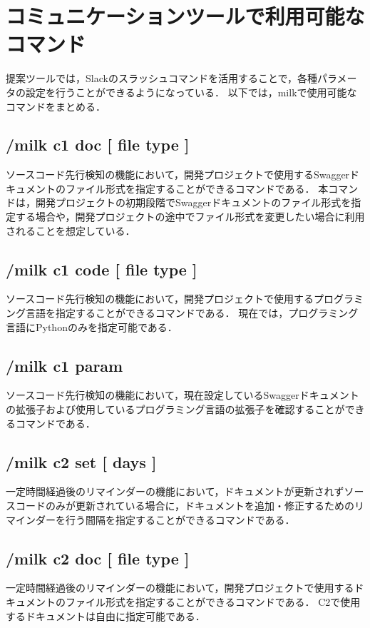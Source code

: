 \section{コミュニケーションツールで利用可能なコマンド}
提案ツールでは，Slackのスラッシュコマンドを活用することで，各種パラメータの設定を行うことができるようになっている．
以下では，milkで使用可能なコマンドをまとめる．

\subsection*{/milk c1 doc [ file type ]}
ソースコード先行検知の機能において，開発プロジェクトで使用するSwaggerドキュメントのファイル形式を指定することができるコマンドである．
本コマンドは，開発プロジェクトの初期段階でSwaggerドキュメントのファイル形式を指定する場合や，開発プロジェクトの途中でファイル形式を変更したい場合に利用されることを想定している．

\subsection*{/milk c1 code [ file type ]}
ソースコード先行検知の機能において，開発プロジェクトで使用するプログラミング言語を指定することができるコマンドである．
現在では，プログラミング言語にPythonのみを指定可能である．

\subsection*{/milk c1 param}
ソースコード先行検知の機能において，現在設定しているSwaggerドキュメントの拡張子および使用しているプログラミング言語の拡張子を確認することができるコマンドである．

\subsection*{/milk c2 set [ days ]}
一定時間経過後のリマインダーの機能において，ドキュメントが更新されずソースコードのみが更新されている場合に，ドキュメントを追加・修正するためのリマインダーを行う間隔を指定することができるコマンドである．

\subsection*{/milk c2 doc [ file type ]}
一定時間経過後のリマインダーの機能において，開発プロジェクトで使用するドキュメントのファイル形式を指定することができるコマンドである．
C2で使用するドキュメントは自由に指定可能である．

